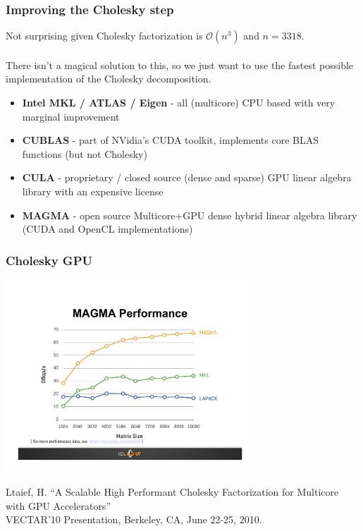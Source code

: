 \documentclass{beamer}
\begin{document}
\begin{frame}
\frametitle{Improving the Cholesky step}

Not surprising given Cholesky factorization is $\mathcal{O}(n^3)$ and $n=3318$.\\
~\\
There isn't a magical solution to this, so we just want to use the fastest possible implementation of the Cholesky decomposition.

\begin{itemize}
\item \textbf{Intel MKL / ATLAS / Eigen} - all (multicore) CPU based with very marginal improvement 
\item \textbf{CUBLAS} - part of NVidia's CUDA toolkit, implements core BLAS functions (but not Cholesky) 
\item \textbf{CULA} - proprietary / closed source (dense and sparse) GPU linear algebra library with an expensive license
\item \textbf{MAGMA} - open source Multicore+GPU dense hybrid linear algebra library (CUDA and OpenCL implementations)
\end{itemize}

\end{frame}


\begin{frame}
\frametitle{Cholesky GPU}

\vfill
\begin{center}
\includegraphics[width=0.7\textwidth]{pics/magma_chol.pdf}
\end{center}
\vfill
{\tiny Ltaief, H. ``A Scalable High Performant Cholesky Factorization for Multicore with GPU Accelerators''\\ VECTAR'10 Presentation, Berkeley, CA, June 22-25, 2010.}
\end{frame}
\end{document}
